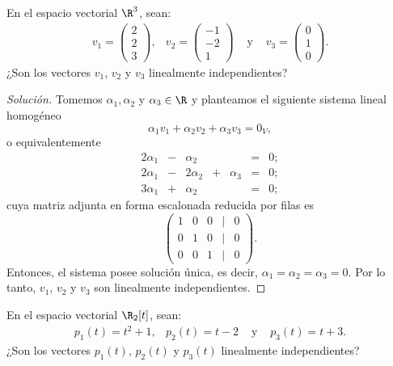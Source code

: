 \documentclass[a4,11pt]{aleph-notas}
\begin{document}
\begin{ejer}
    En el espacio vectorial $\R^{3}$, sean:
    \[
        \begin{array}{cccc}
            v_1 = \begin{pmatrix} 2\\ 2\\ 3 \end{pmatrix}, &
        v_2 = \begin{pmatrix} -1\\ -2\\ 1 \end{pmatrix} &
        \text{ y } &
        v_3 = \begin{pmatrix} 0\\ 1\\ 0 \end{pmatrix}.
        \end{array}
    \]
    ¿Son los vectores $v_1$, $v_2$ y $v_3$ linealmente independientes?
\end{ejer}

\begin{proof}[Solución]\hspace{0pt}
    Tomemos $\alpha_1, \alpha_2$ y $\alpha_3\in\R$ y planteamos el siguiente sistema lineal homogéneo
    \[
        \alpha_1 v_1 + \alpha_2 v_2 + \alpha_3 v_3 = 0_V,
    \]
    o equivalentemente
    \[
        \begin{array}{ccccccc}
            2\alpha_1 & - & \alpha_2 &  & & = & 0;\\
            2\alpha_1 & - & 2\alpha_2 & + & \alpha_3& = & 0;\\
            3\alpha_1 & + & \alpha_2 &  & & = & 0;
        \end{array}
    \]
    cuya matriz adjunta en forma escalonada reducida por filas es
    \[
        \begin{pmatrix}
            1 & 0 & 0 & | & 0\\
            0 & 1 & 0 & | & 0\\
            0 & 0 & 1 & | & 0
        \end{pmatrix}.
    \]
    Entonces, el sistema posee solución única, es decir, $\alpha_1 = \alpha_2 = \alpha_3 = 0$. Por lo tanto, $v_1$, $v_2$ y $v_3$ son linealmente independientes.
\end{proof}

\begin{ejer}
    En el espacio vectorial $\R_2[t]$, sean:
    \[
        \begin{array}{cccc}
            p_1(t) = t^2 + 1, & 
            p_2(t) = t - 2 &
            \text{ y } &
            p_3(t) = t + 3.
        \end{array}
    \]
    ¿Son los vectores $p_1(t)$, $p_2(t)$ y $p_3(t)$ linealmente independientes?
\end{ejer}
\end{document}
